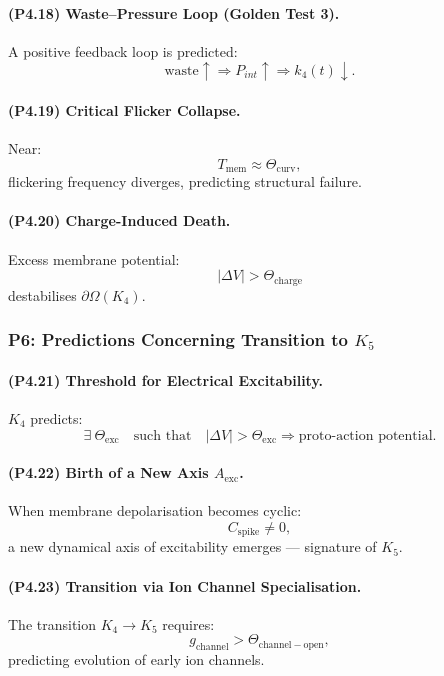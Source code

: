 \paragraph{(P4.18) Waste–Pressure Loop (Golden Test 3).}
A positive feedback loop is predicted:
\[
\text{waste} \uparrow \Rightarrow P_{int} \uparrow 
\Rightarrow k_4(t) \downarrow.
\]

\paragraph{(P4.19) Critical Flicker Collapse.}
Near:
\[
T_{\mathrm{mem}} \approx \Theta_{\mathrm{curv}},
\]
flickering frequency diverges, predicting structural failure.

\paragraph{(P4.20) Charge-Induced Death.}
Excess membrane potential:
\[
|\Delta V| > \Theta_{\mathrm{charge}}
\]
destabilises $\partial\Omega(K_4)$.

\subsubsection{P6: Predictions Concerning Transition to \texorpdfstring{$K_5$}{K_5}}

\paragraph{(P4.21) Threshold for Electrical Excitability.}
$K_4$ predicts:
\[
\exists\ \Theta_{\mathrm{exc}} \quad \text{such that}\quad
|\Delta V| > \Theta_{\mathrm{exc}}
\Rightarrow \text{proto-action potential}.
\]

\paragraph{(P4.22) Birth of a New Axis $A_{\mathrm{exc}}$.}
When membrane depolarisation becomes cyclic:
\[
C_{\mathrm{spike}} \neq 0,
\]
a new dynamical axis of excitability emerges — signature of $K_5$.

\paragraph{(P4.23) Transition via Ion Channel Specialisation.}
The transition $K_4 \to K_5$ requires:
\[
g_{\mathrm{channel}} > \Theta_{\mathrm{channel-open}},
\]
predicting evolution of early ion channels.

